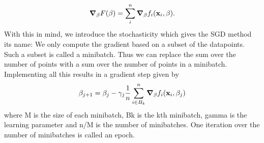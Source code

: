 \documentclass[notitlepage, reprint, nofootinbib]{revtex4-1}
\begin{document}
$$\grad_\beta F(\beta)=\sum_i^n \grad_\beta f_i(\vb{x}_i, \beta).$$
With this in mind, we introduce the stochasticity which gives the SGD method its name: We only compute the gradient based on a subset of the datapoints. Such a subset is called a minibatch. Thus we can replace the sum over the number of points with a sum over the number of points in a minibatch. Implementing all this results in a gradient step given by 
\begin{equation}\label{sgd}\beta_{j+1}=\beta_j-\gamma_j\frac{1}{n}\sum_{i\in B_k}^{n}\grad_\beta f_i(\vb{x}_i, \beta_j)\end{equation}
where M is the size of each minibatch, Bk is the kth minibatch, gamma is the learning parameter and n/M is the number of minibatches. One iteration over the number of minibatches is called an epoch. 
\end{document}
